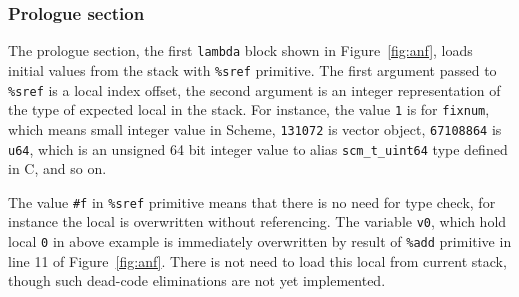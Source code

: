 \documentclass[preprint, 10pt]{sigplanconf}
\begin{document}
\subsubsection{Prologue section}
\label{sec:irprologue}

The prologue section, the first \texttt{lambda} block shown in
Figure~\hyperref[fig:anf]{\ref{fig:anf}}, loads initial values from the stack
with \texttt{\%sref} primitive. The first argument passed to \texttt{\%sref}
is a local index offset, the second argument is an integer representation of
the type of expected local in the stack. For instance, the value \texttt{1} is
for \texttt{fixnum}, which means small integer value in Scheme,
\texttt{131072} is vector object, \texttt{67108864} is \texttt{u64}, which is
an unsigned 64 bit integer value to alias \texttt{scm\_t\_uint64} type defined
in C, and so on.



The value \texttt{\#f} in \texttt{\%sref} primitive means that there is no
need for type check, for instance the local is overwritten without
referencing. The variable \texttt{v0}, which hold local \texttt{0} in above
example is immediately overwritten by result of \texttt{\%add} primitive in
line 11 of Figure~\hyperref[fig:anf]{\ref{fig:anf}}. There is not need to load
this local from current stack, though such dead-code eliminations are not yet
implemented.
\end{document}

